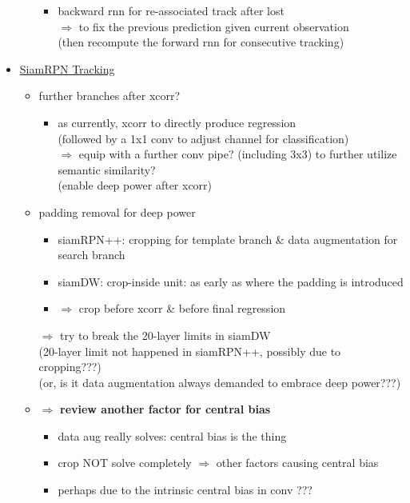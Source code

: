 \begin{itemize}
\begin{itemize}
		\begin{itemize}
		\item backward rnn for re-associated track after lost \\
		$\Rightarrow$ to fix the previous prediction given current observation \\
		(then recompute the forward rnn for consecutive tracking)
		\end{itemize}
	\end{itemize}
\item \underline{SiamRPN Tracking}
	\begin{itemize}
	\item further branches after xcorr?
		\begin{itemize}
		\item as currently, xcorr to directly produce regression \\ 
		(followed by a 1x1 conv to adjust channel for classification) \\
		$\Rightarrow$ equip with a further conv pipe? (including 3x3) to further utilize semantic similarity? \\
		(enable deep power after xcorr)
		\end{itemize}
	\item padding removal for deep power
		\begin{itemize}
		\item siamRPN++: cropping for template branch \& data augmentation for search branch
		\item siamDW: crop-inside unit: as early as where the padding is introduced
		\item $\Rightarrow$ crop before xcorr \& before final regression
		\end{itemize}
	$\Rightarrow$ try to break the 20-layer limits in siamDW \\
	(20-layer limit not happened in siamRPN++, possibly due to cropping???) \\
	(or, is it data augmentation always demanded to embrace deep power???) \\
	\item $\Rightarrow$ \textbf{review another factor for central bias}
		\begin{itemize}
		\item data aug really solves: central bias is the thing
		\item crop NOT solve completely $\Rightarrow$ other factors causing central bias
		\item perhaps due to the intrinsic central bias in conv ???

\end{itemize}
\end{itemize}
\end{itemize}
